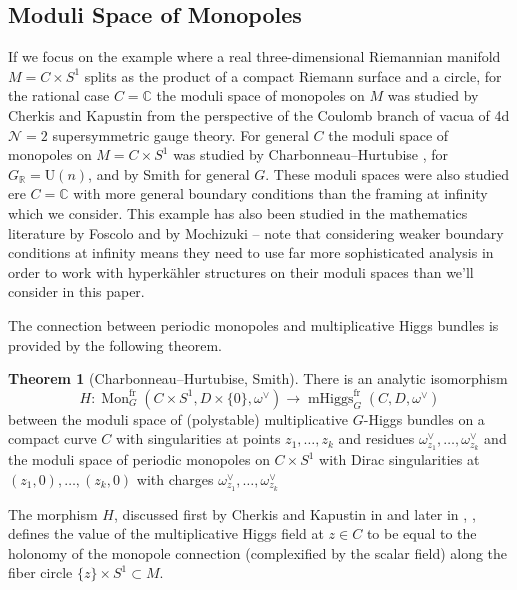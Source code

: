 \documentclass[11pt, oneside, reqno]{amsart}
\theoremstyle{definition} \newtheorem{definition}{Definition}[section]
\newtheorem{theorem}[definition]{Theorem}
\theoremstyle{definition} \newtheorem{remark}[definition]{Remark}
\theoremstyle{definition} \newtheorem{remarks}[definition]{Remarks}
\theoremstyle{definition} \newtheorem{question}[definition]{Question}
\theoremstyle{definition} \newtheorem*{note}{Note}
\theoremstyle{definition} \newtheorem{example}[definition]{Example}
\theoremstyle{definition} \newtheorem{examples}[definition]{Examples}
\newcommand{\mr}[1]{\mathrm{#1}}
\newcommand{\CC}{\mathbb{C}}
\newcommand{\RR}{\mathbb{R}}
\DeclareMathOperator{\mhiggs}{mHiggs}
\DeclareMathOperator{\mon}{Mon}
\newcommand{\fr}{\mathrm{fr}}
\begin{document}
\subsection{Moduli Space of Monopoles}

If we focus on the example where a real three-dimensional Riemannian
manifold $M = C \times S^1$ splits as the product of a compact Riemann
surface and a circle, for the rational case $C = \CC$ the moduli space
of monopoles on $M$ was studied by Cherkis and Kapustin
\cite{CherkisKapustin1,CherkisKapustin2,CherkisKapustin3} from the
perspective of the Coulomb branch of vacua of 4d $\mathcal{N}=2$
supersymmetric gauge theory. For general $C$ the moduli space of
monopoles on $M = C \times S^{1}$ was studied by
Charbonneau--Hurtubise \cite{CharbonneauHurtubise}, for
$G_\RR = \mr U(n)$, and by Smith \cite{Smith} for general $G$.  These
moduli spaces were also studied ere $C = \CC$
with more general boundary conditions than the framing at infinity
which we consider.  This example has also been studied in the
mathematics literature by Foscolo \cite{FoscoloDef, FoscoloThesis} and
by Mochizuki \cite{Mochizuki} -- note that considering weaker boundary
conditions at infinity means they need to use far more sophisticated
analysis in order to work with hyperk\"ahler structures on their
moduli spaces than we'll consider in this paper.

The connection between periodic monopoles and multiplicative Higgs bundles is provided by the following theorem.
\begin{theorem}[Charbonneau--Hurtubise, Smith]
  There is an analytic isomorphism 
  \begin{equation*}
    H: \mon_G^\fr(C \times S^1,D \times\{0\},\omega^\vee) \to \mhiggs_G^{\text{fr}}(C,D,\omega^\vee)
  \end{equation*}
between the moduli space of (polystable) multiplicative $G$-Higgs bundles on a compact curve $C$ with singularities at points $z_1, \ldots, z_k$ and residues $\omega^\vee_{z_1}, \ldots, \omega^\vee_{z_k}$ and the moduli space of periodic monopoles on $C \times S^1$ with Dirac singularities at $(z_1,0), \ldots, (z_k,0)$ with charges $\omega^\vee_{z_1}, \ldots, \omega^\vee_{z_k}$
\end{theorem}

The morphism $H$,  discussed first by Cherkis and Kapustin in \cite{CherkisKapustin2} and later in
\cite{CharbonneauHurtubise}, \cite{Smith}, \cite{NekrasovPestun}
defines the value of the multiplicative Higgs field at $z \in C$ to be equal to
the holonomy of the monopole connection (complexified by the scalar field) along the fiber circle $\{z\} \times S^{1} \subset M$.
\end{document}
